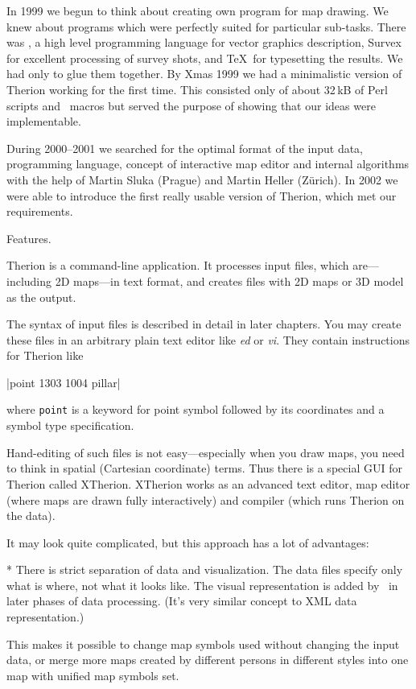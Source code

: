 In 1999 we begun to think about creating own program for map drawing. We knew 
about programs which were perfectly suited for particular sub-tasks. There 
was \MP, a high level programming language for vector graphics description, 
Survex for excellent processing of survey shots, and \TeX\ for typesetting the 
results. We had only to glue them together. By Xmas 
1999 we had a minimalistic version of Therion working for the first time. This 
consisted only of about 32\,kB of Perl scripts and \MP\ macros but served the 
purpose of showing that our ideas were implementable.

During 2000--2001 we searched for the optimal format of the input data, programming 
language, concept of interactive map editor and internal algorithms with the 
help of Martin Sluka (Prague) and Martin Heller (Z\"urich). In 2002 we were able to 
introduce the first really usable version of Therion, which met our requirements.


\subchapter Features.

Therion is a command-line application. It processes input files, which 
are---including 2D maps---in text format, and creates files with 2D maps or 
3D model as the output.

The syntax of input files is described in detail in later chapters. 
You may create these files in an arbitrary plain text editor like 
{\it ed} or {\it vi}. They contain instructions for Therion like 

|point 1303 1004 pillar| 

where {\tt point} is a keyword for point symbol 
followed by its coordinates and a symbol type specification.

Hand-editing of such files is not easy---especially when you draw maps, you 
need to think in spatial (Cartesian coordinate) terms. Thus there is a special 
GUI for Therion called XTherion. XTherion works as an advanced text editor, map 
editor (where maps are drawn fully interactively) and compiler (which runs
Therion on the data).

It may look quite complicated, but this approach has a lot of advantages:

\list
* There is strict separation of data and visualization. The data files specify 
  only what is where, not what it looks like. The visual representation 
  is added by \MP\ in later phases of data processing. (It's very 
  similar concept to XML data representation.) 
  
  This makes it possible to change map symbols used without changing the 
  input data, or merge more maps created by different persons in different 
  styles into one map with unified map symbols set.

